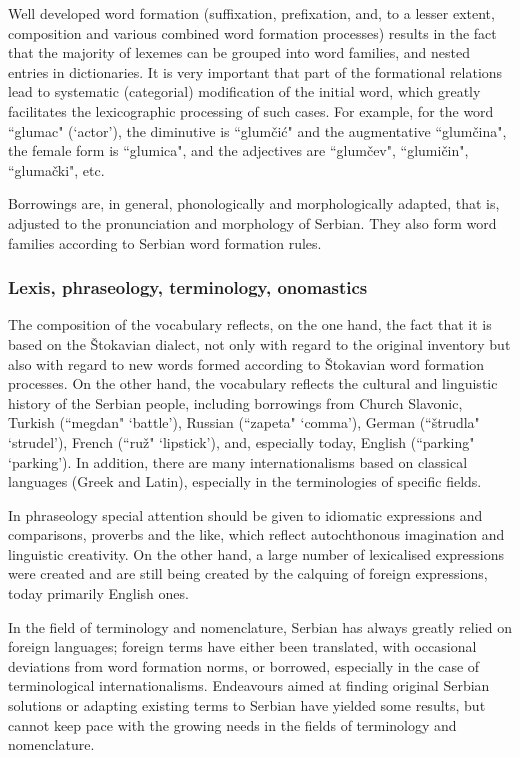 {\begin{multicols}{2}
Well developed word formation (suffixation, prefixation, and, to a lesser extent, composition and various combined word formation processes) results in the fact that the majority of lexemes can be grouped into word families, and nested entries in dictionaries. It is very important that part of the formational relations lead to systematic (categorial) modification of the initial word, which greatly facilitates the lexicographic processing of such cases. For example, for the word ``glumac" (‘actor’), the diminutive is ``glumčić" and the augmentative ``glumčina", the female form is ``glumica", and the adjectives are ``glumčev", ``glumičin", ``glumački", etc.

Borrowings are, in general, phonologically and morphologically adapted, that is, adjusted to the pronunciation and morphology of Serbian. They also form word families according to Serbian word formation rules.

\subsubsection {Lexis, phraseology, terminology, onomastics}

The composition of the vocabulary reflects, on the one hand, the fact that it is based on the Štokavian dialect, not only with regard to the original inventory but also with regard to new words formed according to Štokavian word formation processes. On the other hand, the vocabulary reflects the cultural and linguistic history of the Serbian people, including borrowings from Church Slavonic, Turkish (``megdan" ‘battle’), Russian (``zapeta" ‘comma’), German (``štrudla" ‘strudel’), French (``ruž" ‘lipstick’), and, especially today, English (``parking" ‘parking’). In addition, there are many internationalisms based on classical languages (Greek and Latin), especially in the terminologies of specific fields.

In phraseology special attention should be given to idiomatic expressions and comparisons, proverbs and the like, which reflect autochthonous imagination and linguistic creativity. On the other hand, a large number of lexicalised expressions were created and are still being created by the calquing of foreign expressions, today primarily English ones.

In the field of terminology and nomenclature, Serbian has always greatly relied on foreign languages; foreign terms have either been translated, with occasional deviations from word formation norms, or borrowed, especially in the case of terminological internationalisms. Endeavours aimed at finding original Serbian solutions or adapting existing terms to Serbian have yielded some results, but cannot keep pace with the growing needs in the fields of terminology and nomenclature. 


\end{multicols}}

